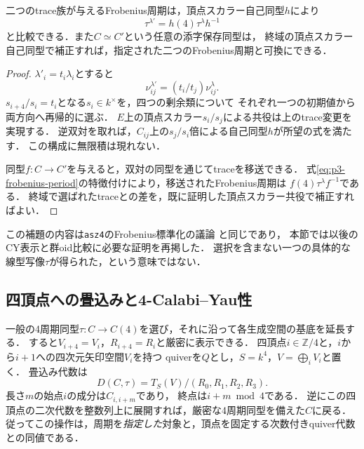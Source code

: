 \begin{lemma}[Frobenius周期の選択独立性]
\label{lem:p3-canonical-period}
二つのtrace族が与えるFrobenius周期は，頂点スカラー自己同型$h$により
\[
 \tau^{\lambda'}=h(4)\tau^\lambda h^{-1}
\]
と比較できる．また$C\simeq C'$という任意の添字保存同型は，
終域の頂点スカラー自己同型で補正すれば，指定された二つのFrobenius周期と可換にできる．
\end{lemma}
\begin{proof}
$\lambda'_i=t_i\lambda_i$とすると
\[
 \nu^{\lambda'}_{ij}=(t_i/t_j)\nu^\lambda_{ij}.
\]
$s_{i+4}/s_i=t_i$となる$s_i\in k^\times$を，四つの剰余類について
それぞれ一つの初期値から両方向へ再帰的に選ぶ．
$E$上の頂点スカラー$s_i/s_j$による共役は上のtrace変更を実現する．
逆双対を取れば，$C_{ij}$上の$s_j/s_i$倍による自己同型$h$が所望の式を満たす．
この構成に無限積は現れない．

同型$f:C\to C'$を与えると，双対の同型を通じてtraceを移送できる．
式\eqref{eq:p3-frobenius-period}の特徴付けにより，移送されたFrobenius周期は
$f(4)\tau^\lambda f^{-1}$である．
終域で選ばれたtraceとの差を，既に証明した頂点スカラー共役で補正すればよい．
\end{proof}

この補題の内容は\texttt{asz4}のFrobenius標準化の議論
\cite[定理\texttt{canonical-four}]{ASZ4Canonical}と同じであり，
本節では以後のCY表示と群oid比較に必要な証明を再掲した．
選択を含まない一つの具体的な線型写像$\tau$が得られた，という意味ではない．

\subsection{四頂点への畳込みと4-Calabi--Yau性}

一般の4周期同型$\tau:C\to C(4)$を選び，それに沿って各生成空間の基底を延長する．
すると$V_{i+4}=V_i$，$R_{i+4}=R_i$と厳密に表示できる．
四頂点$i\in\mathbb Z/4$と，$i$から$i+1$への四次元矢印空間$V_i$を持つ
quiverを$Q$とし，$S=k^4$，$V=\bigoplus_iV_i$と置く．
畳込み代数は
\begin{equation}\label{eq:p3-rolled-algebra}
 D(C,\tau)=T_S(V)/(R_0,R_1,R_2,R_3).
\end{equation}
長さ$m$の始点$i$の成分は$C_{i,i+m}$であり，
終点は$i+m\bmod4$である．
逆にこの四頂点の二次代数を整数列上に展開すれば，厳密な4周期同型を備えた$C$に戻る．
従ってこの操作は，周期を\emph{指定した}対象と，頂点を固定する次数付きquiver代数との同値である．

